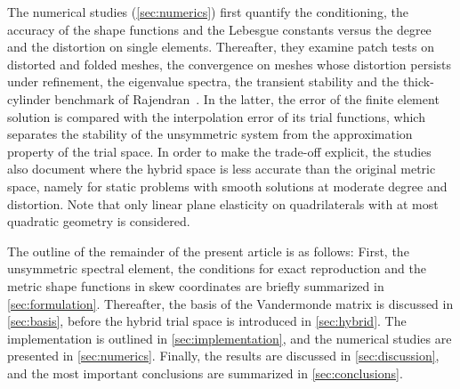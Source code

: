 The numerical studies (\cref{sec:numerics}) first quantify the conditioning, the accuracy of the shape functions and the Lebesgue constants versus the degree and the distortion on single elements. Thereafter, they examine patch tests on distorted and folded meshes, the convergence on meshes whose distortion persists under refinement, the eigenvalue spectra, the transient stability and the thick-cylinder benchmark of Rajendran~\cite{Rajendran2010technique}. In the latter, the error of the finite element solution is compared with the interpolation error of its trial functions, which separates the stability of the unsymmetric system from the approximation property of the trial space. In order to make the trade-off explicit, the studies also document where the hybrid space is less accurate than the original metric space, namely for static problems with smooth solutions at moderate degree and distortion. Note that only linear plane elasticity on quadrilaterals with at most quadratic geometry is considered.

The outline of the remainder of the present article is as follows: First, the unsymmetric spectral element, the conditions for exact reproduction and the metric shape functions in skew coordinates are briefly summarized in \cref{sec:formulation}. Thereafter, the basis of the Vandermonde matrix is discussed in \cref{sec:basis}, before the hybrid trial space is introduced in \cref{sec:hybrid}. The implementation is outlined in \cref{sec:implementation}, and the numerical studies are presented in \cref{sec:numerics}. Finally, the results are discussed in \cref{sec:discussion}, and the most important conclusions are summarized in \cref{sec:conclusions}.